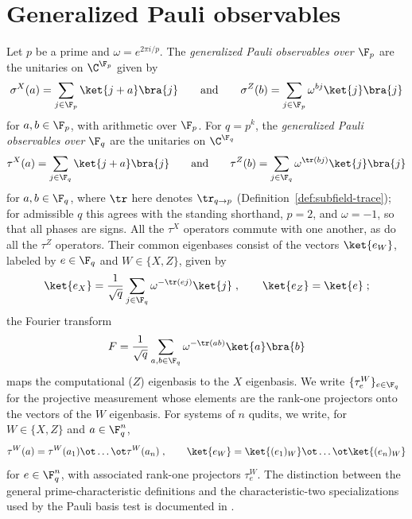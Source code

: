 \section{Generalized Pauli observables}
\label{sec:generalized-pauli}

\begin{definition}\label{def:generalized-pauli}
	\leanok
	Let $p$ be a prime and $\omega = e^{2\pi i/p}$. The \emph{generalized Pauli
	observables over $\F_p$} are the unitaries on $\C^{\F_p}$ given by
	\begin{equation}\label{eq:pauli-fp}
		\sigma^X(a) = \sum_{j \in \F_p} \ket{j + a}\bra{j}
		\qquad \text{and} \qquad
		\sigma^Z(b) = \sum_{j \in \F_p} \omega^{bj} \ket{j}\bra{j}
	\end{equation}
	for $a, b \in \F_p$, with arithmetic over $\F_p$. For $q = p^k$, the
	\emph{generalized Pauli observables over $\F_q$} are the unitaries on
	$\C^{\F_q}$
	\[
		\tau^X(a) = \sum_{j \in \F_q} \ket{j + a}\bra{j}
		\qquad \text{and} \qquad
		\tau^Z(b) = \sum_{j \in \F_q} \omega^{\tr(bj)} \ket{j}\bra{j}
	\]
	for $a, b \in \F_q$, where $\tr$ here denotes $\tr_{q \to p}$
	(Definition~\ref{def:subfield-trace}); for admissible $q$ this agrees with
	the standing shorthand, $p = 2$, and $\omega = -1$, so that all phases are
	signs. All the $\tau^X$ operators commute with one another, as do all the
	$\tau^Z$ operators. Their common eigenbases consist of the vectors
	$\ket{e_W}$, labeled by $e \in \F_q$ and $W \in \{X, Z\}$, given by
	\[
		\ket{e_X} = \frac{1}{\sqrt{q}} \sum_{j \in \F_q}
		\omega^{-\tr(ej)} \ket{j}\;, \qquad
		\ket{e_Z} = \ket{e}\;;
	\]
	the Fourier transform
	\begin{equation}\label{eq:fourier-f}
		F = \frac{1}{\sqrt{q}} \sum_{a, b \in \F_q}
		\omega^{-\tr(ab)} \ket{a}\bra{b}
	\end{equation}
	maps the computational ($Z$) eigenbasis to the $X$ eigenbasis. We write
	$\{\tau^W_e\}_{e \in \F_q}$ for the projective measurement whose elements
	are the rank-one projectors onto the vectors of the $W$ eigenbasis. For
	systems of $n$ qudits, we write, for $W \in \{X,Z\}$ and $a \in \F_q^n$,
	\[
		\tau^W(a) = \tau^W(a_1) \ot \dots \ot \tau^W(a_n)\;, \qquad
		\ket{e_W} = \ket{(e_1)_W} \ot \dots \ot \ket{(e_n)_W}
	\]
	for $e \in \F_q^n$, with associated rank-one projectors $\tau^W_e$.
	The distinction between the general prime-characteristic definitions and
	the characteristic-two specializations used by the Pauli basis test is
	documented in \cite{gap:qpbt_characteristic-two-pauli-scope}.
\end{definition}

